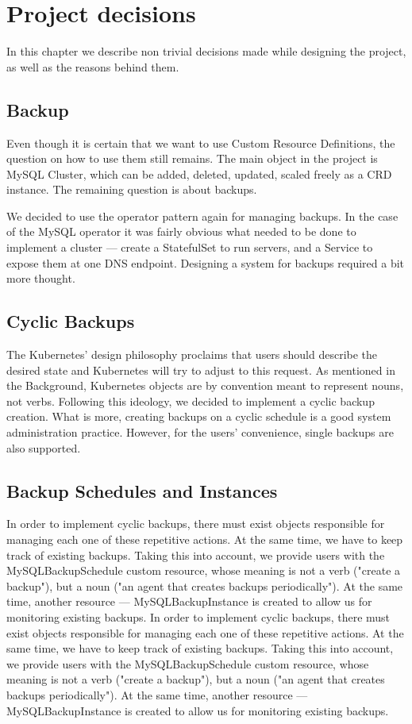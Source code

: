 \chapter{Project decisions}
In this chapter we describe non trivial decisions made while designing the project, as well as the
reasons behind them.

\section{Backup}
Even though it is certain that we want to use Custom Resource Definitions, the question on how to
use them still remains. The main object in the project is MySQL Cluster, which can be added,
deleted, updated, scaled freely as a CRD instance. The remaining question is about backups.

We decided to use the operator pattern again for managing backups. In the case of the MySQL
operator it was fairly obvious what needed to be done to implement a cluster --- create a
StatefulSet to run servers, and a Service to expose them at one DNS endpoint. Designing a system
for backups required a bit more thought.

\section{Cyclic Backups}
The Kubernetes’ design philosophy proclaims that users should describe the desired state and
Kubernetes will try to adjust to this request. As mentioned in the Background, Kubernetes objects
are by convention meant to represent nouns, not verbs. Following this ideology, we decided to
implement a cyclic backup creation. What is more, creating backups on a cyclic schedule is a
good system administration practice. However, for the users’ convenience, single backups are also
supported.

\section{Backup Schedules and Instances}
In order to implement cyclic backups, there must exist objects responsible for managing each one of
these repetitive actions. At the same time, we have to keep track of existing backups. Taking this
into account, we provide users with the MySQLBackupSchedule custom resource, whose meaning is not a
verb ("create a backup"), but a noun ("an agent that creates backups periodically"). At the same
time, another resource --- MySQLBackupInstance is created to allow us for monitoring existing
backups. In order to implement cyclic backups, there must exist objects responsible for managing
each one of these repetitive actions. At the same time, we have to keep track of existing backups.
Taking this into account, we provide users with the MySQLBackupSchedule custom resource, whose
meaning is not a verb ("create a backup"), but a noun ("an agent that creates backups periodically").
At the same time, another resource --- MySQLBackupInstance is created to allow us for monitoring
existing backups.

